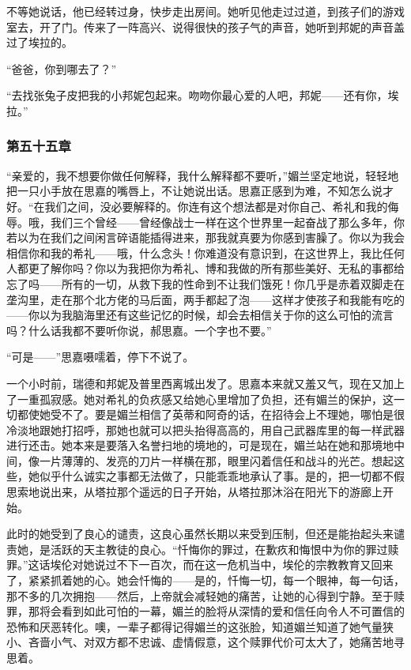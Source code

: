 \par 不等她说话，他已经转过身，快步走出房间。她听见他走过过道，到孩子们的游戏室去，开了门。传来了一阵高兴、说得很快的孩子气的声音，她听到邦妮的声音盖过了埃拉的。
\par “爸爸，你到哪去了？”
\par “去找张兔子皮把我的小邦妮包起来。吻吻你最心爱的人吧，邦妮——还有你，埃拉。”

\subsubsection{第五十五章}

\par “亲爱的，我不想要你做任何解释，我什么解释都不要听，”媚兰坚定地说，轻轻地把一只小手放在思嘉的嘴唇上，不让她说出话。思嘉正感到为难，不知怎么说才好。“在我们之间，没必要解释的。你连有这个想法都是对你自己、希礼和我的侮辱。哦，我们三个曾经——曾经像战士一样在这个世界里一起奋战了那么多年，你若以为在我们之间闲言碎语能插得进来，那我就真要为你感到害臊了。你以为我会相信你和我的希礼——哦，什么念头！你难道没有意识到，在这世界上，我比任何人都更了解你吗？你以为我把你为希礼、博和我做的所有那些美好、无私的事都给忘了吗——所有的一切，从救下我的性命到不让我们饿死！你几乎是赤着双脚走在垄沟里，走在那个北方佬的马后面，两手都起了泡——这样才使孩子和我能有吃的——你以为我脑海里还有这些记忆的时候，却会去相信关于你的这么可怕的流言吗？什么话我都不要听你说，郝思嘉。一个字也不要。”
\par “可是——”思嘉嗫嚅着，停下不说了。
\par 一个小时前，瑞德和邦妮及普里西离城出发了。思嘉本来就又羞又气，现在又加上了一重孤寂感。她对希礼的负疚感又给她心里增加了负担，还有媚兰的保护，这一切都使她受不了。要是媚兰相信了英蒂和阿奇的话，在招待会上不理她，哪怕是很冷淡地跟她打招呼，那她也就可以把头抬得高高的，用自己武器库里的每一样武器进行还击。她本来是要落入名誉扫地的境地的，可是现在，媚兰站在她和那境地中间，像一片薄薄的、发亮的刀片一样横在那，眼里闪着信任和战斗的光芒。想起这些，她似乎什么诚实之事都无法做了，只能乖乖地承认了事。是的，把一切都不假思索地说出来，从塔拉那个遥远的日子开始，从塔拉那沐浴在阳光下的游廊上开始。
\par 此时的她受到了良心的谴责，这良心虽然长期以来受到压制，但还是能抬起头来谴责她，是活跃的天主教徒的良心。“忏悔你的罪过，在歉疚和悔恨中为你的罪过赎罪。”这话埃伦对她说过不下一百次，而在这一危机当中，埃伦的宗教教育又回来了，紧紧抓着她的心。她会忏悔的——是的，忏悔一切，每一个眼神，每一句话，那不多的几次拥抱——然后，上帝就会减轻她的痛苦，让她的心得到宁静。至于赎罪，那将会看到如此可怕的一幕，媚兰的脸将从深情的爱和信任向令人不可置信的恐怖和厌恶转化。噢，一辈子都得记得媚兰的这张脸，知道媚兰知道了她气量狭小、吝啬小气、对双方都不忠诚、虚情假意，这个赎罪代价可太大了，她痛苦地寻思着。
